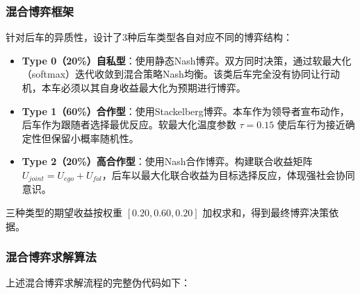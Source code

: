 \subsubsection{混合博弈框架}
针对后车的异质性，设计了3种后车类型各自对应不同的博弈结构：

\begin{itemize}
    \item \textbf{Type 0（20\%）自私型}：使用静态Nash博弈。双方同时决策，通过软最大化（softmax）迭代收敛到混合策略Nash均衡。该类后车完全没有协同让行动机，本车必须以其自身收益最大化为预期进行博弈。
    \item \textbf{Type 1（60\%）合作型}：使用Stackelberg博弈。本车作为领导者宣布动作，后车作为跟随者选择最优反应。软最大化温度参数 $\tau = 0.15$ 使后车行为接近确定性但保留小概率随机性。
    \item \textbf{Type 2（20\%）高合作型}：使用Nash合作博弈。构建联合收益矩阵 $U_{joint} = U_{ego} + U_{fol}$，后车以最大化联合收益为目标选择反应，体现强社会协同意识。
\end{itemize}

三种类型的期望收益按权重 $[0.20, 0.60, 0.20]$ 加权求和，得到最终博弈决策依据。

\subsubsection{混合博弈求解算法}
上述混合博弈求解流程的完整伪代码如下：

